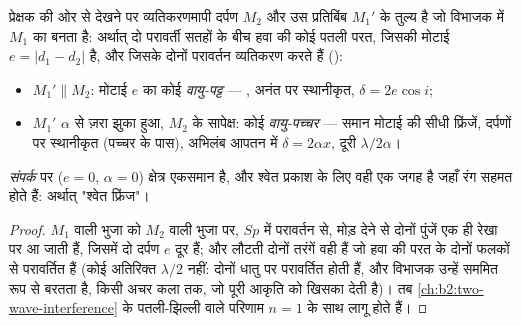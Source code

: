 \begin{proposition}[तुल्य व्यवस्था]\label{prop:b2:michelson:equivalent}
प्रेक्षक की ओर से देखने पर व्यतिकरणमापी दर्पण
$M_2$ और उस प्रतिबिंब $M_1'$ के तुल्य है जो विभाजक में $M_1$ का बनता है: अर्थात् दो परावर्ती
सतहों के बीच हवा की कोई पतली परत, जिसकी मोटाई $e = |d_1 - d_2|$ है, और जिसके
दोनों परावर्तन व्यतिकरण करते हैं ():
\begin{itemize}
  \item $M_1' \parallel M_2$: मोटाई $e$ का कोई \emph{वायु-पट्ट} --- , अनंत पर स्थानीकृत, $\delta = 2e\cos i$;
  \item $M_1'$ $\alpha$ से ज़रा झुका हुआ, $M_2$ के सापेक्ष: कोई \emph{वायु-पच्चर}
        --- समान मोटाई की सीधी फ्रिंजें, दर्पणों पर स्थानीकृत
        (पच्चर के पास), अभिलंब आपतन में $\delta = 2\alpha x$,
        दूरी $\lambda/2\alpha$।
\end{itemize}
\emph{संपर्क} पर ($e = 0$, $\alpha = 0$) क्षेत्र एकसमान है, और श्वेत
प्रकाश के लिए वही एक जगह है जहाँ रंग सहमत होते हैं: अर्थात् "श्वेत फ्रिंज"।
\end{proposition}

\begin{proof}
$M_1$ वाली भुजा को $M_2$ वाली भुजा पर, $Sp$ में परावर्तन से, मोड़ देने से
दोनों पुंजें एक ही रेखा पर आ जाती हैं, जिसमें दो दर्पण $e$ दूर हैं; और लौटती दोनों
तरंगें वही हैं जो हवा की परत के दोनों फलकों से परावर्तित हैं (कोई अतिरिक्त
$\lambda/2$ नहीं: दोनों धातु पर परावर्तित होती हैं, और विभाजक उन्हें
सममित रूप से बरतता है, किसी अचर कला तक, जो पूरी आकृति को खिसका देती है)।
तब \cref{ch:b2:two-wave-interference} के पतली-झिल्ली वाले परिणाम
$n = 1$ के साथ लागू होते हैं।
\end{proof}

